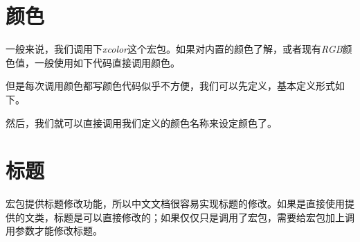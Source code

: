 \begin{latex}
\lhead{\leftmark}%
\rhead{\rightmark}%
\end{latex}

\section{颜色}
一般来说，我们调用下\emph{xcolor}这个宏包。如果对内置的颜色了解，或者现有\emph{RGB}颜色值，一般使用如下代码直接调用颜色。

\begin{center}
\color[RGB]{204, 128, 92}{Color Text中文测试}
\end{center}

\begin{latex}
\color[RGB]{204, 128, 92}{Color Text中文测试}
\end{latex}

但是每次调用颜色都写颜色代码似乎不方便，我们可以先定义，基本定义形式如下。
\begin{latex}
\usepackage{xcolor}%
\end{latex}

然后，我们就可以直接调用我们定义的颜色名称来设定颜色了。

\begin{center}
\end{center}

\begin{latex}
\color{keyword}{\slshape function, return, if, true, false}
\end{latex}

\section{标题}

\CTeX 宏包提供标题修改功能，所以中文文档很容易实现标题的修改。如果是直接使用\CTeX 提供的文类，标题是可以直接修改的；如果仅仅只是调用了\CTeX 宏包，需要给宏包加上调用参数才能修改标题。

\begin{latex}
\usepackage[
    heading=true,%
]{ctex}
\end{latex}